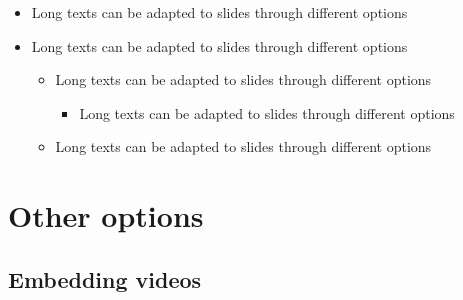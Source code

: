 \documentclass[usepdftitle=false,professionalfonts,compress ]{beamer}
\begin{document}
{\begin{frame}
\begin{itemize}
\begin{itemize}
			\item Long texts can be adapted to slides through different options
			\item Long texts can be adapted to slides through different options
			\begin{itemize}

				\item Long texts can be adapted to slides through different options
				\item Long texts can be adapted to slides through different options
				\item Long texts can be adapted to slides through different options
				\item Long texts can be adapted to slides through different options
			\end{itemize}
		\end{itemize}
		\item Long texts can be adapted to slides through different options
		\item Long texts can be adapted to slides through different options
		\begin{itemize}

			\item Long texts can be adapted to slides through different options
			\begin{itemize}

				\item Long texts can be adapted to slides through different options
			\end{itemize}
			\item Long texts can be adapted to slides through different options
		\end{itemize}
	\end{itemize}

\end{frame}
}
















\section{Other options}
		
\subsection{Embedding videos}
\end{document}
